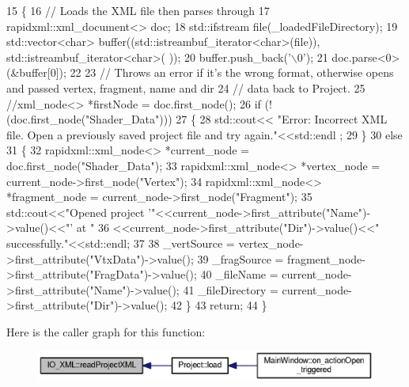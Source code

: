 \begin{DoxyCode}
15 \{
16   \textcolor{comment}{// Loads the XML file then parses through}
17   rapidxml::xml\_document<> doc;
18   std::ifstream file(\_loadedFileDirectory);
19   std::vector<char> buffer((std::istreambuf\_iterator<char>(file)), std::istreambuf\_iterator<char>( ));
20   buffer.push\_back(\textcolor{charliteral}{'\(\backslash\)0'});
21   doc.parse<0>(&buffer[0]);
22 
23   \textcolor{comment}{// Throws an error if it's the wrong format, otherwise opens and passed vertex, fragment, name and dir}
24   \textcolor{comment}{// data back to Project.}
25   \textcolor{comment}{//xml\_node<> *firstNode = doc.first\_node();}
26   \textcolor{keywordflow}{if} (!(doc.first\_node(\textcolor{stringliteral}{"Shader\_Data"})))
27   \{
28     std::cout<< \textcolor{stringliteral}{"Error: Incorrect XML file. Open a previously saved project file and try again."}<<std::endl
      ;
29   \}
30   \textcolor{keywordflow}{else}
31   \{
32     rapidxml::xml\_node<> *current\_node = doc.first\_node(\textcolor{stringliteral}{"Shader\_Data"});
33     rapidxml::xml\_node<> *vertex\_node = current\_node->first\_node(\textcolor{stringliteral}{"Vertex"});
34     rapidxml::xml\_node<> *fragment\_node = current\_node->first\_node(\textcolor{stringliteral}{"Fragment"});
35     std::cout<<\textcolor{stringliteral}{"Opened project '"}<<current\_node->first\_attribute(\textcolor{stringliteral}{"Name"})->value()<<\textcolor{stringliteral}{"' at "}
36              <<current\_node->first\_attribute(\textcolor{stringliteral}{"Dir"})->value()<<\textcolor{stringliteral}{" successfully."}<<std::endl;
37 
38     \_vertSource = vertex\_node->first\_attribute(\textcolor{stringliteral}{"VtxData"})->value();
39     \_fragSource = fragment\_node->first\_attribute(\textcolor{stringliteral}{"FragData"})->value();
40     \_fileName = current\_node->first\_attribute(\textcolor{stringliteral}{"Name"})->value();
41     \_fileDirectory = current\_node->first\_attribute(\textcolor{stringliteral}{"Dir"})->value();
42   \}
43   \textcolor{keywordflow}{return};
44 \}
\end{DoxyCode}


Here is the caller graph for this function\-:\nopagebreak
\begin{figure}[H]
\begin{center}
\leavevmode
\includegraphics[width=350pt]{class_i_o___x_m_l_ac9748a44ad55bb8c3c52e1e5952b23a3_icgraph}
\end{center}
\end{figure}


